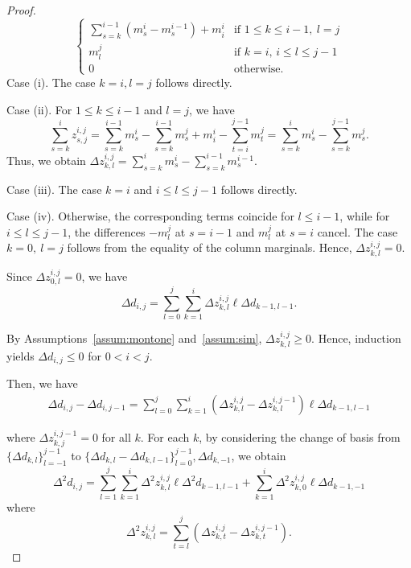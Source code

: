 \documentclass[pdflatex,sn-mathphys-num]{sn-jnl}%
\theoremstyle{thmstyleone}%
\theoremstyle{thmstyletwo}%
\theoremstyle{thmstylethree}%
\begin{document}
\begin{proof}
\[\begin{cases}
\displaystyle
\sum_{s=k}^{i-1}\left(m^{i}_s-m^{i-1}_s\right)+m^i_i
&\text{if } 1 \le k \le i-1,\ l=j\\[10pt]

m^j_{l}
&\text{if }  k=i, \, i \le l \le j-1 \\[10pt]

0
& \text{otherwise.}
\end{cases}
\]
Case (i). The case $k=i, l=j$ follows directly.

\noindent Case (ii). For $1 \le k \le i-1$ and $l=j$, we have
\[\sum_{s=k}^{i} z^{i,j}_{s,j} =\sum^{i-1}_{s=k}m^i_s - \sum^{i-1}_{s=k}m^j_s+m^{i}_i-\sum^{j-1}_{t=i}m^j_t=\sum^{i}_{s=k}m^i_s - \sum^{j-1}_{s=k}m^j_s.\] 
Thus, we obtain $\Delta z^{i,j}_{k,l}=\sum^{i}_{s=k}m^i_s-\sum^{i-1}_{s=k}m^{i-1}_s$.


\noindent Case (iii). The case $k=i$ and $i \le l \le j-1$ follows directly.

\noindent Case (iv). Otherwise, the corresponding terms coincide for $l\le i-1$, while for $i\le l\le j-1$, the differences $-m_l^j$ at $s=i-1$ and $m_l^j$ at $s=i$ cancel. The case $k=0,\ l=j$ follows from the equality of the column marginals. Hence, $\Delta z_{k,l}^{i,j}=0$.

Since $\Delta z^{i,j}_{0,l}=0$,  we have 
\[
\Delta d_{i,j} =  \sum_{l=0}^{j} \sum_{k=1}^{i} \Delta z^{i,j}_{k,l} \ell \Delta d_{k-1,l-1}.
\]

By Assumptions~\ref{assum:montone} and~\ref{assum:sim}, $\Delta z^{i,j}_{k,l} \ge 0$. Hence, induction yields $\Delta d_{i,j} \le 0$ for $0 < i<j$.

Then, we have 
\begin{align*}
    \Delta d_{i,j} - \Delta d_{i,j-1} =   \sum_{l=0}^{j} \sum_{k=1}^{i} (\Delta z^{i,j}_{k,l}-\Delta z^{i,j-1}_{k,l})\ell \Delta d_{k-1,l-1}
\end{align*}

where $\Delta z^{i,j-1}_{k,j}=0$ for all $k$. For each $k$, by considering the change of basis from $\{\Delta d_{k,l}\}^{j-1}_{l=-1}$ to $\{\Delta d_{k,l}-\Delta d_{k,l-1}\}^{j-1}_{l=0}, \Delta d_{k,-1}$, we obtain
\[
\Delta^2 d_{i,j} = \sum_{l=1}^{j} \sum_{k=1}^{i} \Delta^2 z^{i,j}_{k,l}\ell \Delta^2 d_{k-1,l-1} +\sum_{k=1}^{i} \Delta^2 z^{i,j}_{k,0}\ell \Delta d_{k-1,-1} 
 \]
where
\[
\Delta^2 z^{i,j}_{k,l} = \sum_{t=l}^{j} (\Delta z^{i,j}_{k,t} - \Delta z^{i,j-1}_{k,t}).
\]




\end{proof}
\end{document}
